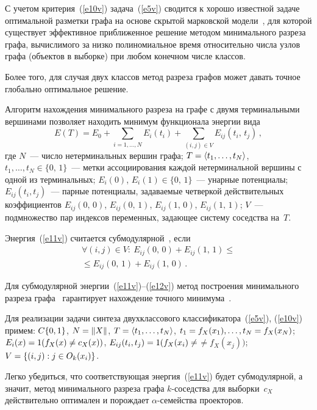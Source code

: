 \begin{multicols}{2}
С учетом критерия~(\ref{e10v}) задача~(\ref{e5v}) сводится к хорошо известной задаче 
оптимальной разметки графа на основе скрытой марковской модели~\cite{10v}, для которой 
существует эффективное приближенное решение методом минимального разреза графа, 
вычислимого за низко полиномиальное время относительно числа узлов графа (объектов в 
выборке) при любом конечном числе классов. 

Более того, для случая двух классов метод разреза 
графов может давать точное глобально оптимальное решение.

Алгоритм нахождения минимального разреза на графе с двумя терминальными вершинами 
позволяет находить минимум функционала энергии вида
\begin{equation}
E(T)= E_0 +\! \sum\limits_{i=1,\ldots , N}\! E_i (t_i) + \sum\limits_{(i,j)\in V} E_{ij}(t_i,\,t_j)\,,
\label{e11v}
\end{equation}
где $N$~--- число нетерминальных вершин графа; $T\hm=\langle t_1, \ldots , t_N\rangle$, $t_1, \ldots 
,t_N \in \{0,\,1\}$~--- метки ассоциирования каждой нетерминальной вершины с одной из 
терминальных; $E_i(0)$, $E_i(1)\in\{0,\,1\}$~--- унарные потенциалы; $E_{ij}(t_i, t_j)$~--- парные 
потенциалы, задаваемые четверкой действительных коэффициентов $E_{ij}(0,\,0)$, $E_{ij}(0,\,1)$, 
$E_{ij}(1,\,0)$, $E_{ij}(1,\,1)$; $V$~--- подмножество пар индексов переменных, за\-да\-ющее систему 
соседства на~$T$.
   
   Энергия~(\ref{e11v}) считается субмодулярной~\cite{11v}, \mbox{если}
   \begin{multline}
   \forall (i,j)\in V:\ E_{ij}(0,\,0)+E_{ij}(1,\,1)\leq{}\\
   {}\leq E_{ij}(0,\,1)+E_{ij}(1,\,0)\,.
   \label{e12v}
   \end{multline}

Для субмодулярной энергии~(\ref{e11v})--(\ref{e12v}) метод построения минимального разреза 
графа~\cite{12v, 11v} гарантирует нахождение точного минимума~\cite{12v}.

Для реализации задачи синтеза двухклассового классификатора~(\ref{e5v}), (\ref{e10v}) примем: 
$C\hm \{0,1\}$, $N\hm=\Vert X\Vert$, $T\hm=\langle t_1, \ldots , t_N\rangle$, $t_1\hm = f_X(x_1), 
\ldots , t_N \hm =f_X(x_N)$; $E_i(x)\hm= 1(f_X(x) \hm\not= c_X(x))$, $E_{ij}(t_i, t_j)\hm=1(f_X(x_i) 
\not=$\linebreak $\not= f_X(x_j))$; $V\hm = \{(i, j): j\in O_k(x_i)\}$. 

Легко убедиться, что соответствующая 
энергия~(\ref{e11v}) будет субмодулярной, а значит, метод минимального разреза графа 
$k$-со\-сед\-ст\-ва для выборки~$c_X$ действительно оптимален и порождает 
$\alpha$-се\-мей\-ст\-ва проекторов.




\end{multicols}
